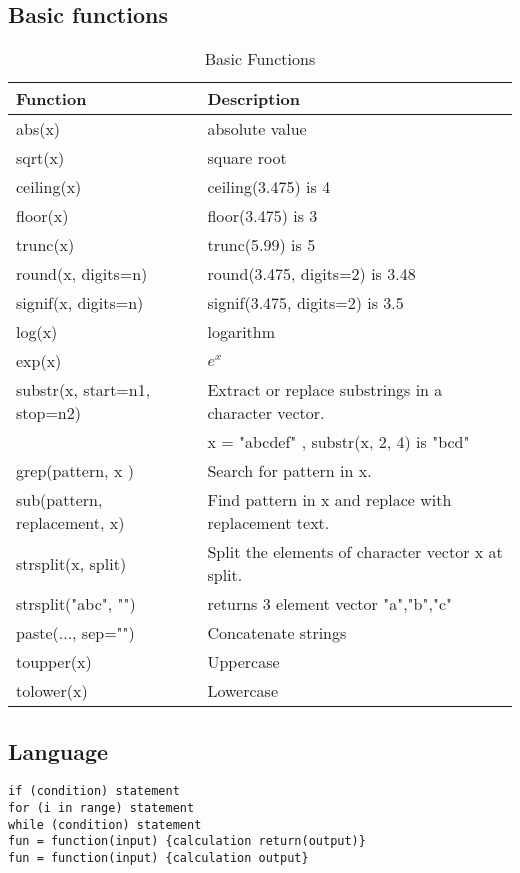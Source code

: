 \documentclass[11pt,a4paper]{article}
\newcommand{\1}{\mathbb{1}}
\begin{document}
\subsection{Basic functions}

\FloatBarrier
\begin{table}[!ht]
\caption{Basic Functions}
\begin{center}
\begin{tabular}{ll}
\hline 
Function & 	Description \\ \hline 
abs(x) & 	absolute value \\
sqrt(x) 	& square root \\
ceiling(x) & 	ceiling(3.475) is 4\\
floor(x) & 	floor(3.475) is 3\\
trunc(x) & 	trunc(5.99) is 5\\
round(x, digits=n) & 	round(3.475, digits=2) is 3.48\\
signif(x, digits=n) & 	signif(3.475, digits=2) is 3.5\\
log(x) & 	logarithm \\
exp(x) & 	$e^x$ \\ \hline 
substr(x, start=n1, stop=n2) 	& Extract or replace substrings in a character vector.\\
&x = "abcdef" , substr(x, 2, 4) is "bcd"\\
grep(pattern, x ) &	Search for pattern in x. \\
sub(pattern, replacement, x) &	Find pattern in x and replace with replacement text. \\
strsplit(x, split) & 	Split the elements of character vector x at split.\\
strsplit("abc", "") & returns 3 element vector "a","b","c"\\
paste(..., sep="")  & 	Concatenate strings\\
toupper(x) &	 Uppercase\\
tolower(x) & 	Lowercase\\
\hline 
\end{tabular} 
\end{center}
\end{table}
\FloatBarrier

\subsection{Language}

\begin{verbatim}
if (condition) statement 
for (i in range) statement
while (condition) statement
fun = function(input) {calculation return(output)} 
fun = function(input) {calculation output} 
\end{verbatim}
\end{document}
